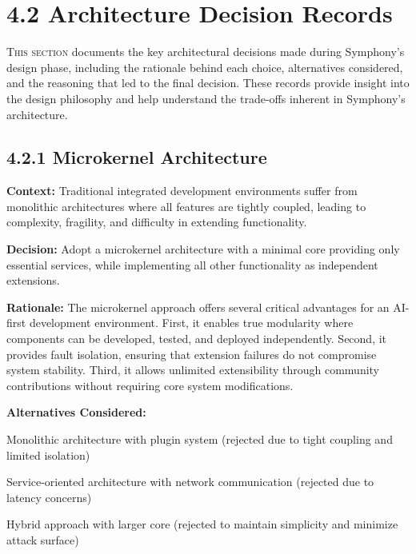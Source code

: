 
\section{4.2 Architecture Decision Records}
\label{sec:architecture-decisions}
\setcounter{subsection}{0}

\lettrine{T}{his section} documents the key architectural decisions made during Symphony's design phase, including the rationale behind each choice, alternatives considered, and the reasoning that led to the final decision. These records provide insight into the design philosophy and help understand the trade-offs inherent in Symphony's architecture.

\subsection*{4.2.1 Microkernel Architecture}

\textbf{Context:} Traditional integrated development environments suffer from monolithic architectures where all features are tightly coupled, leading to complexity, fragility, and difficulty in extending functionality.

\textbf{Decision:} Adopt a microkernel architecture with a minimal core providing only essential services, while implementing all other functionality as independent extensions.

\textbf{Rationale:} The microkernel approach offers several critical advantages for an AI-first development environment. First, it enables true modularity where components can be developed, tested, and deployed independently. Second, it provides fault isolation, ensuring that extension failures do not compromise system stability. Third, it allows unlimited extensibility through community contributions without requiring core system modifications.

\textbf{Alternatives Considered:}
\begin{compactlist}
    \item Monolithic architecture with plugin system (rejected due to tight coupling and limited isolation)
    \item Service-oriented architecture with network communication (rejected due to latency concerns)
    \item Hybrid approach with larger core (rejected to maintain simplicity and minimize attack surface)
\end{compactlist}

